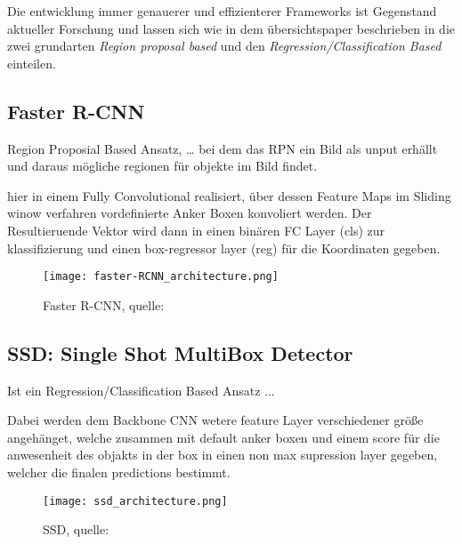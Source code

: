 Die entwicklung immer genauerer und effizienterer 
Frameworks ist Gegenstand aktueller Forschung und lassen 
sich wie in dem übersichtspaper \cite{ouaknineReviewDeepLearning}
beschrieben in die zwei grundarten \textit{Region proposal based} 
und den \textit{Regression/Classification Based} einteilen.



\subsection{Faster R-CNN}
Region Proposial Based Ansatz, \dots \cite{renFasterRCNNRealTime2016a}
bei dem das RPN ein Bild als unput erhällt und
daraus mögliche regionen für objekte im Bild findet.

hier in einem Fully Convolutional realisiert, über dessen 
Feature Maps im Sliding winow verfahren vordefinierte Anker
 Boxen konvoliert werden. Der Resultieruende Vektor wird 
 dann in einen binären FC Layer (cls) zur klassifizierung und 
einen box-regressor layer (reg) für die Koordinaten gegeben.


\begin{figure}[H]
    \centering
    \label{fig:faster_rcnn}
    \texttt{[image: faster-RCNN\_architecture.png]}
    \caption{Faster R-CNN, quelle: \cite{ObjectDetectionDummies2017b}}
\end{figure}



\subsection{SSD: Single Shot MultiBox Detector}
Ist ein Regression/Classification Based Ansatz ... \cite{liuSSDSingleShot2016}

Dabei werden dem Backbone CNN wetere feature Layer verschiedener größe 
angehänget, welche zusammen mit default anker boxen und einem score 
für die anwesenheit des objakts in der box in einen non max supression 
layer gegeben, welcher die finalen predictions bestimmt.


\begin{figure}[H]
    \centering
    \label{fig:faster_rcnn}
    \texttt{[image: ssd\_architecture.png]}
    \caption{SSD, quelle: \cite{SSDSingleShot}}
\end{figure}


